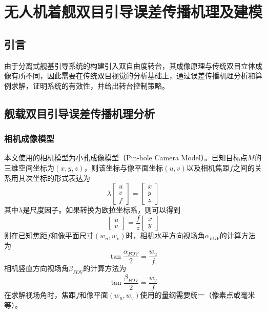 \chapter{无人机着舰双目引导误差传播机理及建模}


\section{引言}
由于分离式舰基引导系统的构建引入双自由度转台，其成像原理与传统双目立体成像有所不同，因此需要在传统双目视觉的分析基础上，通过误差传播机理分析和算例求解，证明系统的有效性，并给出转台控制策略。
\section{舰载双目引导误差传播机理分析}
\subsection{相机成像模型}
本文使用的相机模型为小孔成像模型（Pin-hole Camera Model）。已知目标点$M$的三维空间坐标为$(x,y,z)$，则该坐标与像平面坐标$(u,v)$以及相机焦距$f$之间的关系用其次坐标的形式表达为
\begin{equation}
\lambda\left[ {\begin{array}{*{20}{c}}
	u \\ 
	v \\ 
	f 
	\end{array}} \right] =\left[ {\begin{array}{*{20}{c}}
	x \\ 
	y \\ 
	z 
	\end{array}} \right]
\end{equation}
其中$\lambda$是尺度因子。如果转换为欧拉坐标系，则可以得到
\begin{equation}
\left[ {\begin{array}{*{20}{c}}
	u \\ 
	v 
	\end{array}} \right] =\frac{f}{z} \left[ {\begin{array}{*{20}{c}}
	x \\ 
	y   
	\end{array}} \right]
\end{equation}
则在已知焦距$f$和像平面尺寸$(w_u,w_v)$时，相机水平方向视场角$\alpha_{FOV}$的计算方法为
\begin{equation}
\tan{\frac{\alpha_{FOV}}{2}}=\frac{w_u}{f}
\end{equation}
相机竖直方向视场角$\beta_{FOV}$的计算方法为
\begin{equation}
\tan{\frac{\beta_{FOV}}{2}}=\frac{w_v}{f}
\end{equation}
在求解视场角时，焦距$f$和像平面$(w_u,w_v)$使用的量纲需要统一（像素点或毫米等）。

